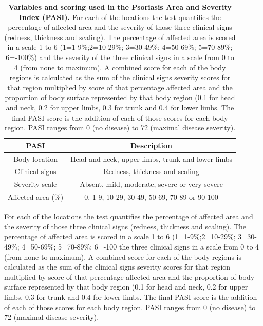 \begin{table}[htbp]
\setlength{\tabcolsep}{20pt}
\renewcommand{\arraystretch}{1.5}
\begin{tabular}{@{} c c}
\toprule
\textbf{PASI} & \textbf{Description} \\
\midrule
\midrule
Body location  & Head and neck, upper limbs, trunk and lower limbs\\
Clinical signs & Redness, thickness and scaling \\
Severity scale & Absent, mild, moderate, severe or very severe \\
Affected area (\%)  & 0, 1-9, 10-29, 30-49, 50-69, 70-89 or 90-100 \\
\bottomrule
\end{tabular}
\medskip %
\caption[Variables and scoring used in the Psoriasis Area and Severity Index (PASI)]{\textbf{Variables and scoring used in the Psoriasis Area and Severity Index (PASI).} For each of the locations the test quantifies the percentage of affected area and the severity of those three clinical signs (redness, thickness and scaling). The percentage of affected area is scored in a scale 1 to 6 (1=1-9\%;2=10-29\%; 3=30-49\%; 4=50-69\%; 5=70-89\%; 6=-100\%) and the severity of
the three clinical signs in a scale from 0 to 4 (from none to maximum). A combined score for each of the body regions is calculated as the sum of the clinical signs severity scores for that region multiplied by score of that percentage affected area and the proportion of body surface represented by that body region (0.1 for head and neck, 0.2 for upper limbs, 0.3 for trunk and 0.4 for lower limbs. The final PASI score is the addition of each of those scores for each body region. PASI ranges from 0 (no disease) to 72 (maximal disease severity).}
\label{tab:PASI}
\end{table}
\bigskip %

For each of the locations the test quantifies the percentage of affected area and the severity of those three clinical signs (redness, thickness and scaling). The percentage of affected area is scored in a scale 1 to 6 (1=1-9\%;2=10-29\%; 3=30-49\%; 4=50-69\%; 5=70-89\%; 6=-100%
the three clinical signs in a scale from 0 to 4 (from none to maximum). A combined score for each of the body regions is calculated as the sum of the clinical signs severity scores for that region multiplied by score of that percentage affected area and the proportion  of body surface represented by that body region (0.1 for head and neck, 0.2 for upper limbs, 0.3 for trunk and 0.4 for lower limbs. The final PASI score is the addition of each of those scores for each body region. PASI ranges from 0 (no disease) to 72 (maximal disease severity).



